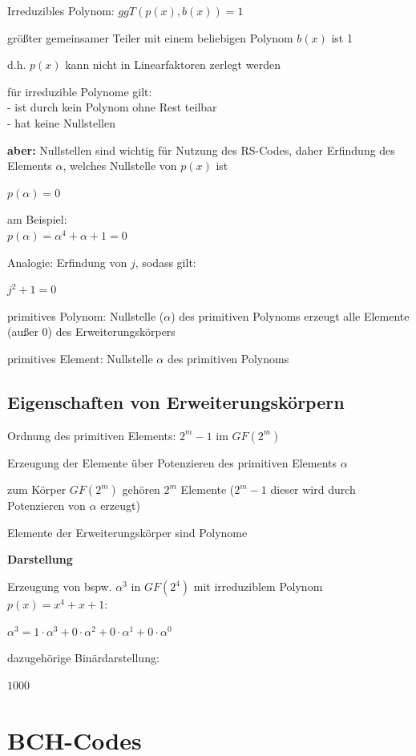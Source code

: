 Irreduzibles Polynom: $ggT(p(x), b(x)) = 1$

größter gemeinsamer Teiler mit einem beliebigen Polynom $b(x)$ ist 1

d.h. $p(x)$ kann nicht in Linearfaktoren zerlegt werden

für irreduzible Polynome gilt:\\
- ist durch kein Polynom ohne Rest teilbar\\
- hat keine Nullstellen

\textbf{aber:} Nullstellen sind wichtig für Nutzung des RS-Codes, daher \frqq Erfindung\flqq{} des
Elements $\alpha$, welches Nullstelle von $p(x)$ ist

$\displaystyle{
    p(\alpha) = 0
}$

am Beispiel:\\
$\displaystyle{
    p(\alpha) = \alpha^4 + \alpha + 1 = 0
}$

Analogie: \frqq Erfindung\flqq{} von $j$, sodass gilt:

$\displaystyle{
    j^2 + 1 = 0
}$

primitives Polynom: Nullstelle ($\alpha$) des primitiven Polynoms erzeugt alle Elemente (außer 0) des Erweiterungskörpers

primitives Element: Nullstelle $\alpha$ des primitiven Polynoms

\subsection{Eigenschaften von Erweiterungskörpern}

Ordnung des primitiven Elements: $2^m - 1$ im $GF(2^m)$

Erzeugung der Elemente über Potenzieren des primitiven Elements $\alpha$

zum Körper $GF(2^m)$ gehören $2^m$ Elemente ($2^m - 1$ dieser wird durch Potenzieren von $\alpha$ erzeugt)

Elemente der Erweiterungskörper sind Polynome

\textbf{Darstellung}

Erzeugung von bspw. $\alpha^3$ in $GF(2^4)$ mit irreduziblem Polynom $p(x) = x^4 + x + 1$:

$\displaystyle{
    \alpha^3 = 1 \cdot \alpha^3 + 0 \cdot \alpha^2 + 0 \cdot \alpha^1 + 0 \cdot \alpha^0
}$

dazugehörige Binärdarstellung:

$1000$

\section{BCH-Codes}

